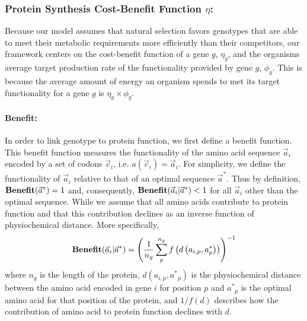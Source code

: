 \documentclass{article}
\newcommand{\Funcaoptvec}{\ensuremath{\Func(\aoptvec)}\xspace}
\newcommand{\Funcaveci}{\ensuremath{\Func(\aveci|\aoptvec)}\xspace}
\newcommand{\Func}{\ensuremath{\text{\textbf{Benefit}}}\xspace}
\newcommand{\aip}{\ensuremath{a_{i,p}}\xspace}
\newcommand{\aoptp}{\ensuremath{\aopt_p}\xspace}
\newcommand{\aoptvec}{\ensuremath{\Vec{a}^*}\xspace}
\newcommand{\aopt}{\ensuremath{a^*}\xspace}
\newcommand{\aveci}{\ensuremath{\Vec{a}_i}\xspace}
\newcommand{\cveci}{\ensuremath{\cvec_i}\xspace}
\newcommand{\cvec}{\ensuremath{\Vec{c}}\xspace}
\newcommand{\phig}{\ensuremath{\phi_{g}}\xspace}
\renewcommand{\ng}{\ensuremath{{n_g}}\xspace}
\renewcommand{\ng}{\ensuremath{{n_g}}\xspace}
\begin{document}
\begin{itemize}
\subsubsection*{Protein Synthesis Cost-Benefit Function $\eta$: }
Because our model assumes that natural selection favors genotypes that are able to meet their metabolic requirements more efficiently than their competitors, our framework centers on the cost-benefit function of a gene $g$, $\eta_g$, and the organisms average target production rate of the functionality provided by gene $g$, $\phig$.
This is because the average amount of energy an organism spends to met its target functionality for a gene $g$ is $\eta_g \times \phig$.
 
\paragraph*{Benefit: }
In order to link genotype to protein function, we first define a benefit function.
This benefit function measures the functionality of the amino acid sequence \aveci encoded by a set of codons \cveci, i.e. $a(\cveci) = \aveci$.
For simplicity, we define the functionality of \aveci  relative to that of an optimal sequence $\aoptvec$.
Thus by definition,  $\Funcaoptvec = 1$ and, consequently, $\Funcaveci < 1$ for all $\aveci$ other than the optimal sequence.
While we assume that all amino acids contribute to protein function and that this contribution declines as an inverse function of physiochemical distance.
More specifically, 
\begin{equation}
\Funcaveci = \left(\frac{1}{\ng} \sum_p^\ng{} f\left(d\left(\aip, \aoptp\right)\right)\right)^{-1}
\end{equation}
where $\ng$ is the length of the protein, $d(\aip, \aoptp)$ is the physiochemical distance between the amino acid encoded in gene $i$ for position $p$ and $\aoptp$ is the optimal amino acid for that position of the protein, and $1/f(d)$ describes how the contribution of amino acid to protein function declines with $d$.


\end{itemize}
\end{document}
